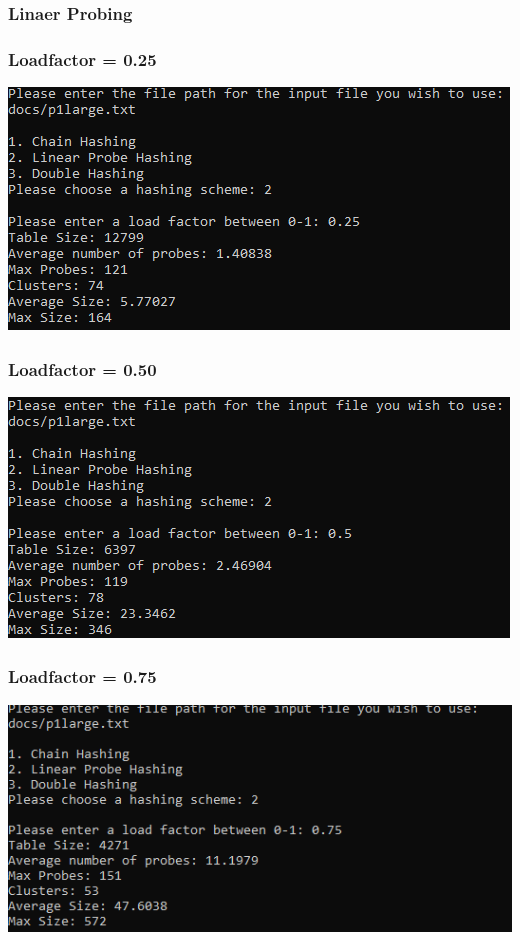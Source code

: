 \documentclass[titlepage]{article}
\begin{document}
\subsubsection{Linaer Probing}
\subsubsection{Loadfactor = 0.25}
\includegraphics[]{Large_Input/LF_0_25/LinearProbe.png}
\subsubsection{Loadfactor = 0.50}
\includegraphics[]{Large_Input/LF_0_50/LinearProbe.png}
\subsubsection{Loadfactor = 0.75}
\includegraphics[]{Large_Input/LF_0_75/LinearProbe.png}
\end{document}
